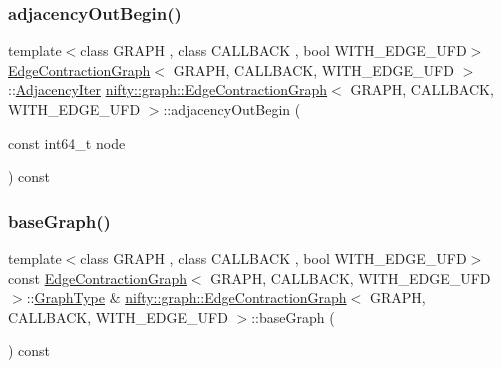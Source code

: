 \mbox{\label{classnifty_1_1graph_1_1EdgeContractionGraph_ac852a6bd37df982e507c0ab1319f4bfc}} 
\subsubsection{\texorpdfstring{adjacency\+Out\+Begin()}{adjacencyOutBegin()}}
{\footnotesize\ttfamily template$<$class G\+R\+A\+PH , class C\+A\+L\+L\+B\+A\+CK , bool W\+I\+T\+H\+\_\+\+E\+D\+G\+E\+\_\+\+U\+FD$>$ \\
\hyperlink{classnifty_1_1graph_1_1EdgeContractionGraph}{Edge\+Contraction\+Graph}$<$ G\+R\+A\+PH, C\+A\+L\+L\+B\+A\+CK, W\+I\+T\+H\+\_\+\+E\+D\+G\+E\+\_\+\+U\+FD $>$\+::\hyperlink{classnifty_1_1graph_1_1EdgeContractionGraph_a447212f5ced0c4ef4d304e8b89f4f200}{Adjacency\+Iter} \hyperlink{classnifty_1_1graph_1_1EdgeContractionGraph}{nifty\+::graph\+::\+Edge\+Contraction\+Graph}$<$ G\+R\+A\+PH, C\+A\+L\+L\+B\+A\+CK, W\+I\+T\+H\+\_\+\+E\+D\+G\+E\+\_\+\+U\+FD $>$\+::adjacency\+Out\+Begin (\begin{DoxyParamCaption}\item[{const int64\+\_\+t}]{node }\end{DoxyParamCaption}) const\hspace{0.3cm}{\ttfamily [inline]}}

\mbox{\label{classnifty_1_1graph_1_1EdgeContractionGraph_a4a3b76832b977d03e8507b47a7f1b0ae}} 
\subsubsection{\texorpdfstring{base\+Graph()}{baseGraph()}}
{\footnotesize\ttfamily template$<$class G\+R\+A\+PH , class C\+A\+L\+L\+B\+A\+CK , bool W\+I\+T\+H\+\_\+\+E\+D\+G\+E\+\_\+\+U\+FD$>$ \\
const \hyperlink{classnifty_1_1graph_1_1EdgeContractionGraph}{Edge\+Contraction\+Graph}$<$ G\+R\+A\+PH, C\+A\+L\+L\+B\+A\+CK, W\+I\+T\+H\+\_\+\+E\+D\+G\+E\+\_\+\+U\+FD $>$\+::\hyperlink{classnifty_1_1graph_1_1EdgeContractionGraph_a67f653761dbc2c203891b041aacc3f04}{Graph\+Type} \& \hyperlink{classnifty_1_1graph_1_1EdgeContractionGraph}{nifty\+::graph\+::\+Edge\+Contraction\+Graph}$<$ G\+R\+A\+PH, C\+A\+L\+L\+B\+A\+CK, W\+I\+T\+H\+\_\+\+E\+D\+G\+E\+\_\+\+U\+FD $>$\+::base\+Graph (\begin{DoxyParamCaption}{ }\end{DoxyParamCaption}) const\hspace{0.3cm}{\ttfamily [inline]}}

